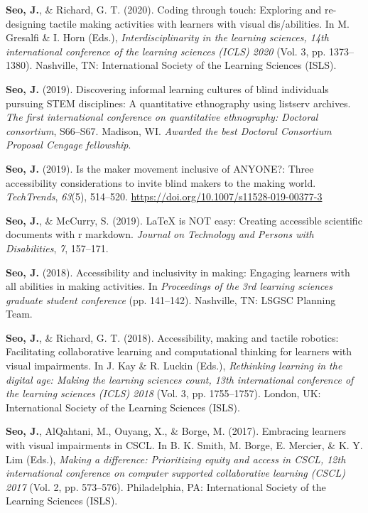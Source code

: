 \documentclass[11pt,a4paper,]{awesome-cv}
\begin{document}
\leavevmode{}%
\textbf{Seo, J.}, \& Richard, G. T. (2020). Coding through touch:
Exploring and re-designing tactile making activities with learners with
visual dis/abilities. In M. Gresalfi \& I. Horn (Eds.),
\emph{Interdisciplinarity in the learning sciences, 14th international
    conference of the learning sciences (ICLS) 2020} (Vol. 3, pp.
1373--1380). Nashville, TN: International Society of the Learning
Sciences (ISLS).

\leavevmode{}%
\textbf{Seo, J.} (2019). Discovering informal learning cultures of blind
individuals pursuing STEM disciplines: A quantitative ethnography using
listserv archives. \emph{The first international conference on
    quantitative ethnography: Doctoral consortium}, S66--S67. Madison, WI.
\emph{Awarded the best Doctoral Consortium Proposal Cengage fellowship}.

\leavevmode{}%
\textbf{Seo, J.} (2019). Is the maker movement inclusive of {ANYONE}?:
Three accessibility considerations to invite blind makers to the making
world. \emph{{TechTrends}}, \emph{63}(5), 514--520.
\url{https://doi.org/10.1007/s11528-019-00377-3}

\leavevmode{}%
\textbf{Seo, J.}, \& McCurry, S. (2019). LaTeX is NOT easy: Creating
accessible scientific documents with r markdown. \emph{Journal on
    Technology and Persons with Disabilities}, \emph{7}, 157--171.

\leavevmode{}%
\textbf{Seo, J.} (2018). Accessibility and inclusivity in making:
Engaging learners with all abilities in making activities. In
\emph{Proceedings of the 3rd learning sciences graduate student
    conference} (pp. 141--142). Nashville, TN: LSGSC Planning Team.

\leavevmode{}%
\textbf{Seo, J.}, \& Richard, G. T. (2018). Accessibility, making and
tactile robotics: Facilitating collaborative learning and computational
thinking for learners with visual impairments. In J. Kay \& R. Luckin
(Eds.), \emph{Rethinking learning in the digital age: Making the
    learning sciences count, 13th international conference of the learning
    sciences (ICLS) 2018} (Vol. 3, pp. 1755--1757). London, UK:
International Society of the Learning Sciences (ISLS).

\leavevmode{}%
\textbf{Seo, J.}, AlQahtani, M., Ouyang, X., \& Borge, M. (2017).
Embracing learners with visual impairments in CSCL. In B. K. Smith, M.
Borge, E. Mercier, \& K. Y. Lim (Eds.), \emph{Making a difference:
    Prioritizing equity and access in CSCL, 12th international conference on
    computer supported collaborative learning (CSCL) 2017} (Vol. 2, pp.
573--576). Philadelphia, PA: International Society of the Learning
Sciences (ISLS).
\end{document}
